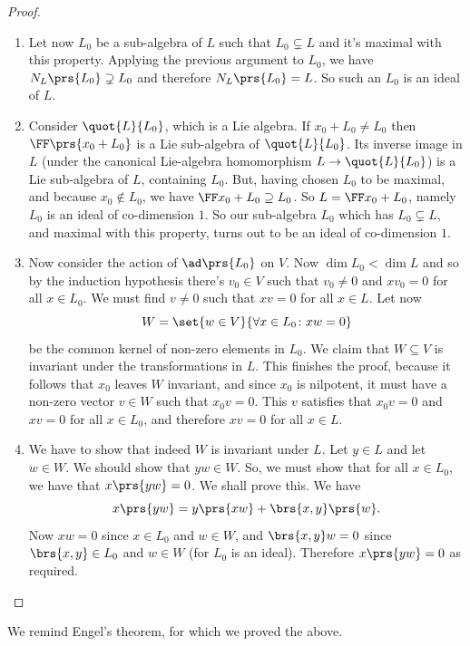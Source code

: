\documentclass[10pt,a4paper,twoside,openany,hidelinks]{book}
\begin{document}
\begin{proof}
\begin{description}
\begin{enumerate}[label=(\Roman*)]
\item
Let now $L_0$ be a sub-algebra of $L$ such that $L_0 \subsetneq L$ and it's maximal with this property. Applying the previous argument to $L_0$, we have $N_L\prs{L_0} \supsetneq L_0$ and therefore $N_L\prs{L_0} = L$. So such an $L_0$ is an ideal of $L$.

\item
Consider $\quot{L}{L_0}$, which is a Lie algebra. If $x_0 + L_0 \neq L_0$ then $\FF\prs{x_0+L_0}$ is a Lie sub-algebra of $\quot{L}{L_0}$.
Its inverse image in $L$ (under the canonical Lie-algebra homomorphism $L \to \quot{L}{L_0}$) is a Lie sub-algebra of $L$, containing $L_0$.
But, having chosen $L_0$ to be maximal, and because $x_0 \notin L_0$, we have $\FF x_0 + L_0 \supseteq L_0$. So $L = \FF x_0 + L_0$, namely $L_0$ is an ideal of co-dimension $1$.
So our sub-algebra $L_0$ which has $L_0 \subsetneq L$, and maximal with this property, turns out to be an ideal of co-dimension $1$.

\item Now consider the action of $\ad \prs{L_0}$ on $V$. Now $\dim L_0 < \dim L$ and so by the induction hypothesis there's $v_0 \in V$ such that $v_0 \neq 0$ and $x v_0 = 0$ for all $x \in L_0$.
We must find $v \neq 0$ such that $xv = 0$ for all $x \in L$. Let now
\[W = \set{w\in V}{\forall x \in L_0 \colon xw = 0}\]
be the common kernel of non-zero elements in $L_0$.
We claim that $W \subseteq V$ is invariant under the transformations in $L$.
This finishes the proof, because it follows that $x_0$ leaves $W$ invariant, and since $x_0$ is nilpotent, it must have a non-zero vector $v \in W$ such that $x_0 v = 0$. This $v$ satisfies that $x_0v = 0$ and $xv = 0$ for all $x \in L_0$, and therefore $xv = 0$ for all $x \in L$.

\item We have to show that indeed $W$ is invariant under $L$. Let $y \in L$ and let $w \in W$. We should show that $yw \in W$. So, we must show that for all $x \in L_0$, we have that $x\prs{yw} = 0$. We shall prove this. We have
\[x\prs{yw} = y\prs{xw} + \brs{x,y}\prs{w}\text{.}\]
Now $xw = 0$ since $x \in L_0$ and $w \in W$, and $\brs{x,y}w = 0$ since $\brs{x,y} \in L_0$ and $w \in W$ (for $L_0$ is an ideal). Therefore
$x\prs{y w} = 0$ as required.
\end{enumerate}
\end{description}
\end{proof}
We remind Engel's theorem, for which we proved the above.
\end{document}
